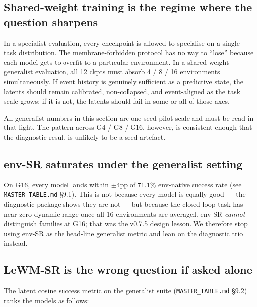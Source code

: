 \documentclass{article}
\begin{document}
\subsection{Shared-weight training is the regime where the question sharpens}

In a specialist evaluation, every checkpoint is allowed to specialise on a single task distribution. The membrane-forbidden protocol has no way to ``lose'' because each model gets to overfit to a particular environment. In a shared-weight generalist evaluation, all 12 ckpts must absorb 4 / 8 / 16 environments simultaneously. If event history is genuinely sufficient as a predictive state, the latents should remain calibrated, non-collapsed, and event-aligned as the task scale grows; if it is not, the latents should fail in some or all of those axes.

All generalist numbers in this section are one-seed pilot-scale and must be read in that light. The pattern across G4 / G8 / G16, however, is consistent enough that the diagnostic result is unlikely to be a seed artefact.

\subsection{env-SR saturates under the generalist setting}

On G16, every model lands within $\pm 4$pp of 71.1\% env-native success rate (see \texttt{MASTER\_TABLE.md} §9.1). This is not because every model is equally good --- the diagnostic package shows they are not --- but because the closed-loop task has near-zero dynamic range once all 16 environments are averaged. env-SR \emph{cannot} distinguish families at G16; that was the v0.7.5 design lesson. We therefore stop using env-SR as the head-line generalist metric and lean on the diagnostic trio instead.

\subsection{LeWM-SR is the wrong question if asked alone}

The latent cosine success metric on the generalist suite (\texttt{MASTER\_TABLE.md} §9.2) ranks the models as follows:
\end{document}
